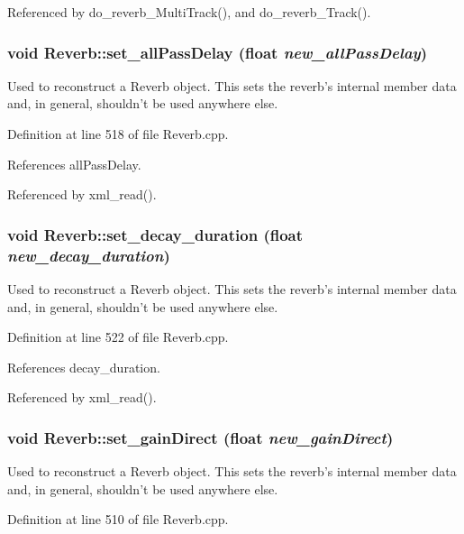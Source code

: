 Referenced by do\_\-reverb\_\-Multi\-Track(), and do\_\-reverb\_\-Track().\hypertarget{classReverb_a15}{
\subsubsection[set\_\-allPassDelay]{\setlength{\rightskip}{0pt plus 5cm}void Reverb::set\_\-all\-Pass\-Delay (float {\em new\_\-all\-Pass\-Delay})}}
\label{classReverb_a15}


Used to reconstruct a Reverb object. This sets the reverb's internal member data and, in general, shouldn't be used anywhere else. 

Definition at line 518 of file Reverb.cpp.

References all\-Pass\-Delay.

Referenced by xml\_\-read().\hypertarget{classReverb_a16}{
\subsubsection[set\_\-decay\_\-duration]{\setlength{\rightskip}{0pt plus 5cm}void Reverb::set\_\-decay\_\-duration (float {\em new\_\-decay\_\-duration})}}
\label{classReverb_a16}


Used to reconstruct a Reverb object. This sets the reverb's internal member data and, in general, shouldn't be used anywhere else. 

Definition at line 522 of file Reverb.cpp.

References decay\_\-duration.

Referenced by xml\_\-read().\hypertarget{classReverb_a13}{
\subsubsection[set\_\-gainDirect]{\setlength{\rightskip}{0pt plus 5cm}void Reverb::set\_\-gain\-Direct (float {\em new\_\-gain\-Direct})}}
\label{classReverb_a13}


Used to reconstruct a Reverb object. This sets the reverb's internal member data and, in general, shouldn't be used anywhere else. 

Definition at line 510 of file Reverb.cpp.

